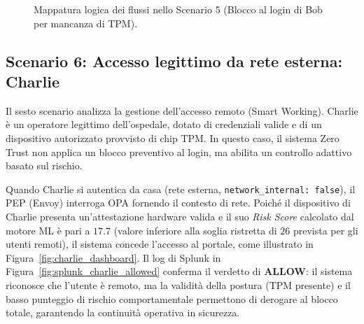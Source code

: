 \begin{figure}[H]
{%
}
\caption{Mappatura logica dei flussi nello Scenario 5 (Blocco al login di Bob per mancanza di TPM).}
\label{fig:scenario_bob}
\end{figure}

\subsection{Scenario 6: Accesso legittimo da rete esterna: Charlie}
Il sesto scenario analizza la gestione dell'accesso remoto (Smart Working). Charlie è un operatore legittimo dell'ospedale, dotato di credenziali valide e di un dispositivo autorizzato provvisto di chip TPM. In questo caso, il sistema Zero Trust non applica un blocco preventivo al login, ma abilita un controllo adattivo basato sul rischio.

Quando Charlie si autentica da casa (rete esterna, \texttt{network\_internal: false}), il PEP (Envoy) interroga OPA fornendo il contesto di rete. Poiché il dispositivo di Charlie presenta un'attestazione hardware valida e il suo \textit{Risk Score} calcolato dal motore ML è pari a $17.7$ (valore inferiore alla soglia ristretta di $26$ prevista per gli utenti remoti), il sistema concede l'accesso al portale, come illustrato in Figura~\ref{fig:charlie_dashboard}. Il log di Splunk in Figura~\ref{fig:splunk_charlie_allowed} conferma il verdetto di \textbf{ALLOW}: il sistema riconosce che l'utente è remoto, ma la validità della postura (TPM presente) e il basso punteggio di rischio comportamentale permettono di derogare al blocco totale, garantendo la continuità operativa in sicurezza.

